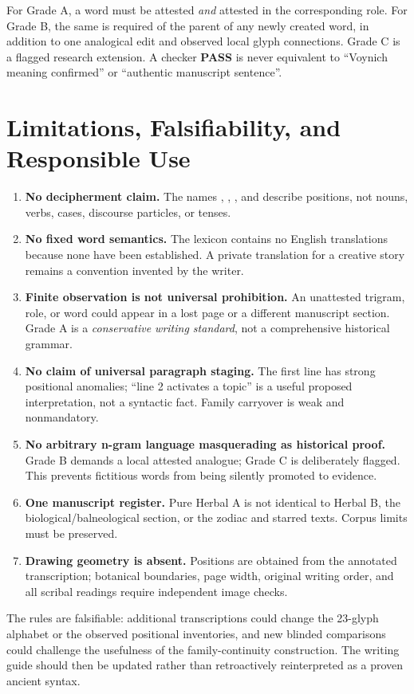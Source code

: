 \documentclass[11pt,a4paper]{article}
\newcommand{\EVA}[1]{{\ttfamily\detokenize{#1}}}
\newcommand{\STATUS}[1]{\textsf{\bfseries #1}}
\begin{document}
For Grade A, a word must be attested \emph{and} attested in the corresponding role. For Grade B, the same is required of the parent of any newly created word, in addition to one analogical edit and observed local glyph connections. Grade C is a flagged research extension. A checker \STATUS{PASS} is never equivalent to ``Voynich meaning confirmed'' or ``authentic manuscript sentence''.

\section{Limitations, Falsifiability, and Responsible Use}
\begin{enumerate}
\item \textbf{No decipherment claim.} The names \EVA{PHW}, \EVA{W2}, \EVA{LF}, and \EVA{PF_LF} describe positions, not nouns, verbs, cases, discourse particles, or tenses.
\item \textbf{No fixed word semantics.} The lexicon contains no English translations because none have been established. A private translation for a creative story remains a convention invented by the writer.
\item \textbf{Finite observation is not universal prohibition.} An unattested trigram, role, or word could appear in a lost page or a different manuscript section. Grade A is a \emph{conservative writing standard}, not a comprehensive historical grammar.
\item \textbf{No claim of universal paragraph staging.} The first line has strong positional anomalies; ``line 2 activates a topic'' is a useful proposed interpretation, not a syntactic fact. Family carryover is weak and nonmandatory.
\item \textbf{No arbitrary n-gram language masquerading as historical proof.} Grade B demands a local attested analogue; Grade C is deliberately flagged. This prevents fictitious words from being silently promoted to evidence.
\item \textbf{One manuscript register.} Pure Herbal A is not identical to Herbal B, the biological/balneological section, or the zodiac and starred texts. Corpus limits must be preserved.
\item \textbf{Drawing geometry is absent.} Positions are obtained from the annotated transcription; botanical boundaries, page width, original writing order, and all scribal readings require independent image checks.
\end{enumerate}

The rules are falsifiable: additional transcriptions could change the 23-glyph alphabet or the observed positional inventories, and new blinded comparisons could challenge the usefulness of the family-continuity construction. The writing guide should then be updated rather than retroactively reinterpreted as a proven ancient syntax.
\end{document}
